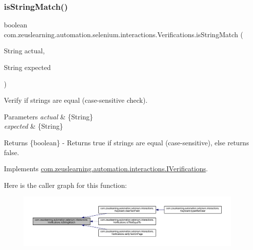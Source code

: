 \subsubsection{\texorpdfstring{is\+String\+Match()}{isStringMatch()}}
{\footnotesize\ttfamily boolean com.\+zeuslearning.\+automation.\+selenium.\+interactions.\+Verifications.\+is\+String\+Match (\begin{DoxyParamCaption}\item[{String}]{actual,  }\item[{String}]{expected }\end{DoxyParamCaption})\hspace{0.3cm}{\ttfamily [inline]}}

Verify if strings are equal (case-\/sensitive check).


\begin{DoxyParams}{Parameters}
{\em actual} & \{String\} \\
\hline
{\em expected} & \{String\} \\
\hline
\end{DoxyParams}
\begin{DoxyReturn}{Returns}
\{boolean\} -\/ Returns {\ttfamily true} if strings are equal (case-\/sensitive), else returns {\ttfamily false}. 
\end{DoxyReturn}


Implements \hyperlink{interfacecom_1_1zeuslearning_1_1automation_1_1interactions_1_1IVerifications_a0851452498cc023e1c68afdd95b23912}{com.\+zeuslearning.\+automation.\+interactions.\+I\+Verifications}.

Here is the caller graph for this function\+:
\nopagebreak
\begin{figure}[H]
\begin{center}
\leavevmode
\includegraphics[width=350pt]{d2/d6b/classcom_1_1zeuslearning_1_1automation_1_1selenium_1_1interactions_1_1Verifications_aebf1b991764984120a1f05adb69fdc4d_icgraph}
\end{center}
\end{figure}
\hypertarget{classcom_1_1zeuslearning_1_1automation_1_1selenium_1_1interactions_1_1Verifications_af7b6b23977e6ef4e53a2a4f0d606e26e}{}\label{classcom_1_1zeuslearning_1_1automation_1_1selenium_1_1interactions_1_1Verifications_af7b6b23977e6ef4e53a2a4f0d606e26e} 

